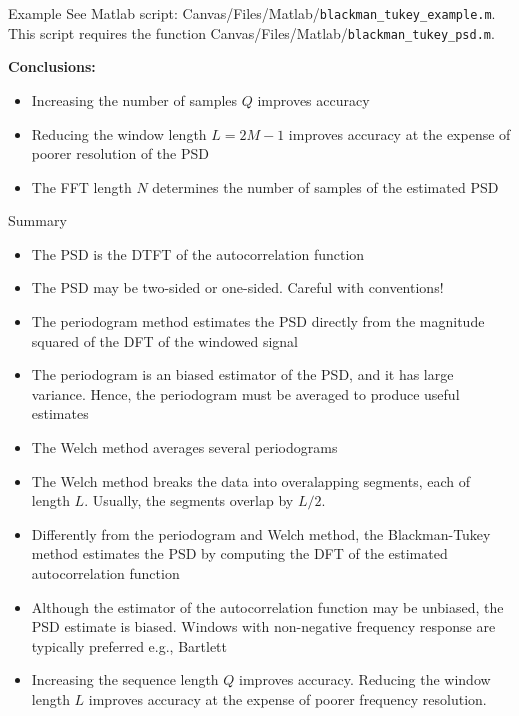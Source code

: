 \documentclass[10pt, aspectratio=169, handout]{beamer}
\begin{document}
\begin{frame}{Example}
	See Matlab script: Canvas/Files/Matlab/\texttt{blackman\_tukey\_example.m}. This script requires the function Canvas/Files/Matlab/\texttt{blackman\_tukey\_psd.m}.
	
	\vspace{0.25cm}
	\textbf{Conclusions:} 
	\begin{itemize}
		\item Increasing the number of samples $Q$ improves accuracy
		\item Reducing the window length $L = 2M-1$ improves accuracy at the expense of poorer resolution of the PSD
		\item The FFT length $N$ determines the number of samples of the estimated PSD
	\end{itemize}
\end{frame}


%
\begin{frame}{Summary}
	\begin{itemize}
		\item The PSD is the DTFT of the autocorrelation function
		\item The PSD may be two-sided or one-sided. Careful with conventions!
		\item The periodogram method estimates the PSD directly from the magnitude squared of the DFT of the windowed signal
		\item The periodogram is an biased estimator of the PSD, and it has large variance. Hence, the periodogram must be averaged to produce useful estimates
		\item The Welch method averages several periodograms
		\item The Welch method breaks the data into overalapping segments, each of length $L$. Usually, the segments overlap by $L/2$.
		\item Differently from the periodogram and Welch method, the Blackman-Tukey method estimates the PSD by computing the DFT of the estimated autocorrelation function
		\item Although the estimator of the autocorrelation function may be unbiased, the PSD estimate is biased. Windows with non-negative frequency response are typically preferred e.g., Bartlett
		\item Increasing the sequence length $Q$ improves accuracy. Reducing the window length $L$ improves accuracy at the expense of poorer frequency resolution.
	\end{itemize}
\end{frame}
\end{document}
